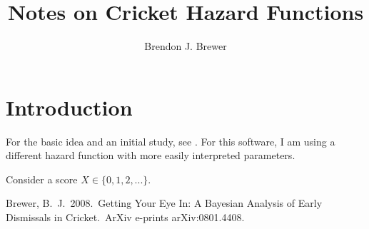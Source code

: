 \documentclass[letterpaper, 11pt]{article}
\title{Notes on Cricket Hazard Functions}
\author{Brendon J. Brewer}
\begin{document}
\maketitle

\section{Introduction}
For the basic idea and an initial study, see \citet{2008arXiv0801.4408B}.
For this software, I am using a different hazard function with more
easily interpreted parameters.

Consider a score $X \in \{0, 1, 2, ... \}$.

\begin{thebibliography}{99}
 Brewer, B.~J.\ 2008.\ Getting 
Your Eye In: A Bayesian Analysis of Early Dismissals in Cricket.\ ArXiv 
e-prints arXiv:0801.4408.
\end{thebibliography}
\end{document}

